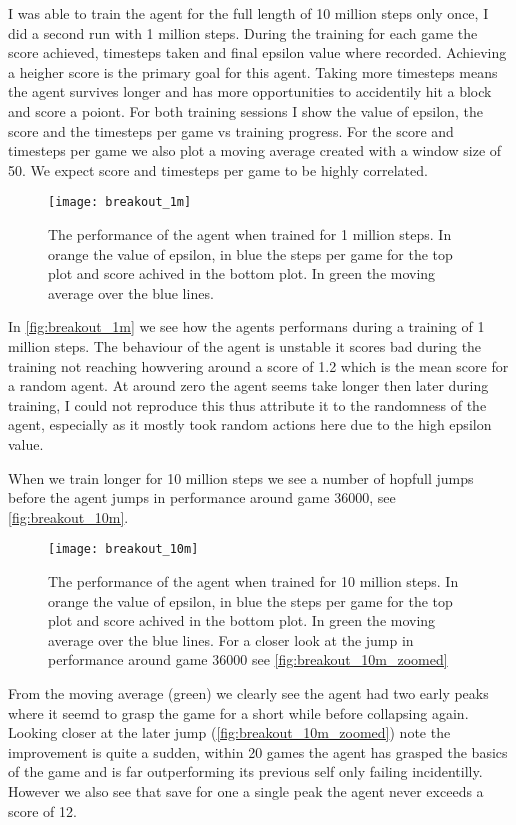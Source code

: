 I was able to train the agent for the full length of 10 million steps only once, I did a second run with 1 million steps. During the training for each game the score achieved, timesteps taken and final epsilon value where recorded. Achieving a heigher score is the primary goal for this agent. Taking more timesteps means the agent survives longer and has more opportunities to accidentily hit a block and score a poiont. For both training sessions I show the value of epsilon, the score and the timesteps per game vs training progress. For the score and timesteps per game we also plot a moving average created with a window size of 50. We expect score and timesteps per game to be highly correlated. 

\begin{figure}
    \texttt{[image: breakout\_1m]}
    \caption{The performance of the agent when trained for 1 million steps. In orange the value of epsilon, in blue the steps per game for the top plot and score achived in the bottom plot. In green the moving average over the blue lines.}
    \label{fig:breakout_1m}
\end{figure}

In \autoref{fig:breakout_1m} we see how the agents performans during a training of 1 million steps. The behaviour of the agent is unstable it scores bad during the training not reaching howvering around a score of 1.2 which is the mean score for a random agent\cite{atari}. At around zero the agent seems take longer then later during training, I could not reproduce this thus attribute it to the randomness of the agent, especially as it mostly took random actions here due to the high epsilon value. 

When we train longer for 10 million steps we see a number of hopfull jumps before the agent jumps in performance around game $36000$, see \autoref{fig:breakout_10m}. 

\begin{figure}
    \texttt{[image: breakout\_10m]}
    \caption{The performance of the agent when trained for 10 million steps. In orange the value of epsilon, in blue the steps per game for the top plot and score achived in the bottom plot. In green the moving average over the blue lines. For a closer look at the jump in performance around game $36000$ see \autoref{fig:breakout_10m_zoomed}}
    \label{fig:breakout_10m}
\end{figure}

From the moving average (green) we clearly see the agent had two early peaks where it seemd to grasp the game for a short while before collapsing again. Looking closer at the later jump (\autoref{fig:breakout_10m_zoomed}) note the improvement is quite a sudden, within 20 games the agent has grasped the basics of the game and is far outperforming its previous self only failing incidentilly. However we also see that save for one a single peak the agent never exceeds a score of 12.

